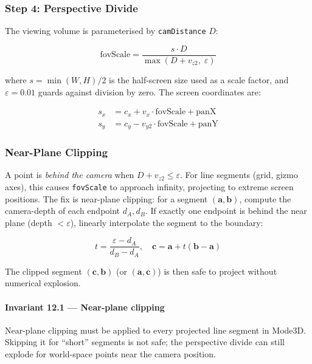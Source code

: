 \subsubsection{Step 4: Perspective Divide}

The viewing volume is parameterised by \texttt{camDistance} $D$:

\begin{equation}
\text{fovScale} = \frac{s \cdot D}{\max(D + v_{z2},\; \varepsilon)}
\label{eq:fovscale}
\end{equation}

where $s = \min(W, H) / 2$ is the half-screen size used as a scale
factor, and $\varepsilon = 0.01$ guards against division by zero.
The screen coordinates are:

\begin{align}
  s_x &= c_x + v_x \cdot \text{fovScale} + \text{panX} \\
  s_y &= c_y - v_{y2} \cdot \text{fovScale} + \text{panY}
\end{align}

\subsubsection{Near-Plane Clipping}

A point is \emph{behind the camera} when $D + v_{z2} \leq \varepsilon$.
For line segments (grid, gizmo axes), this causes \texttt{fovScale} to
approach infinity, projecting to extreme screen positions.
The fix is near-plane clipping: for a segment $(\mathbf{a}, \mathbf{b})$,
compute the camera-depth of each endpoint $d_A, d_B$. If exactly one
endpoint is behind the near plane (depth $< \varepsilon$), linearly
interpolate the segment to the boundary:

\begin{equation}
t = \frac{\varepsilon - d_A}{d_B - d_A}, \quad
\mathbf{c} = \mathbf{a} + t(\mathbf{b} - \mathbf{a})
\end{equation}

The clipped segment $(\mathbf{c}, \mathbf{b})$ (or $(\mathbf{a}, \mathbf{c})$)
is then safe to project without numerical explosion.


\paragraph{Invariant 12.1 --- Near-plane clipping}

  Near-plane clipping must be applied to every projected line segment
  in Mode3D. Skipping it for ``short'' segments is not safe; the
  perspective divide can still explode for world-space points near
  the camera position.




